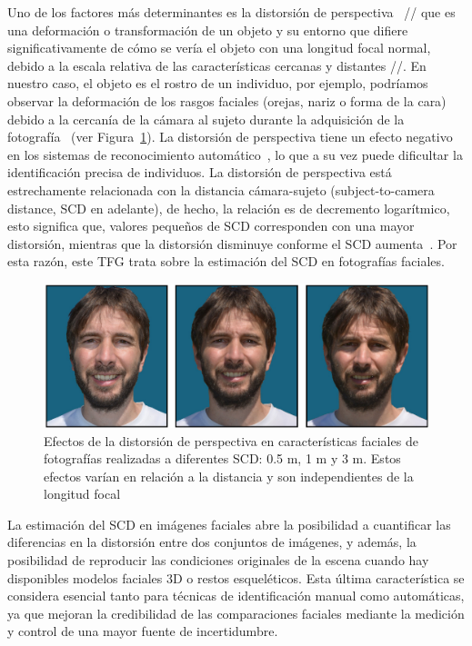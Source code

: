 Uno de los factores más determinantes es la distorsión de perspectiva~\cite{8} // que es una deformación o transformación de un objeto y su entorno que difiere significativamente de cómo se vería el objeto con una longitud focal normal, debido a la escala relativa de las características cercanas y distantes //. En nuestro caso, el objeto es el rostro de un individuo, por ejemplo, podríamos observar la deformación de los rasgos faciales (orejas, nariz o forma de la cara) debido a la cercanía de la cámara al sujeto durante la adquisición de la fotografía~\cite{12} (ver Figura~\ref{fig1}). La distorsión de perspectiva tiene un efecto negativo en los sistemas de reconocimiento automático~\cite{9,10,11}, lo que a su vez puede dificultar la identificación precisa de individuos. La distorsión de perspectiva está estrechamente relacionada con la distancia cámara-sujeto (subject-to-camera distance, SCD en adelante), de hecho, la relación es de decremento logarítmico, esto significa que, valores pequeños de SCD corresponden con una mayor distorsión, mientras que la distorsión disminuye conforme el SCD aumenta~\cite{23}. Por esta razón, este TFG trata sobre la estimación del SCD en fotografías faciales.

\begin{figure}[h]
	\centering
	\includegraphics[scale=0.25]{imagenes/cap1/facial_distortion.png}
	\caption{Efectos de la distorsión de perspectiva en características faciales de fotografías realizadas a diferentes SCD: 0.5 m, 1 m y 3 m. Estos efectos varían en relación a la distancia y son independientes de la longitud focal~\cite{14}}
	\label{fig1}
\end{figure}


La estimación del SCD en imágenes faciales abre la posibilidad a cuantificar las diferencias en la distorsión entre dos conjuntos de imágenes, y además, la posibilidad de reproducir las condiciones originales de la escena cuando hay disponibles modelos faciales 3D o restos esqueléticos. Esta última característica se considera esencial tanto para técnicas de identificación manual como automáticas, ya que mejoran la credibilidad de las comparaciones faciales mediante la medición y control de una mayor fuente de incertidumbre.

